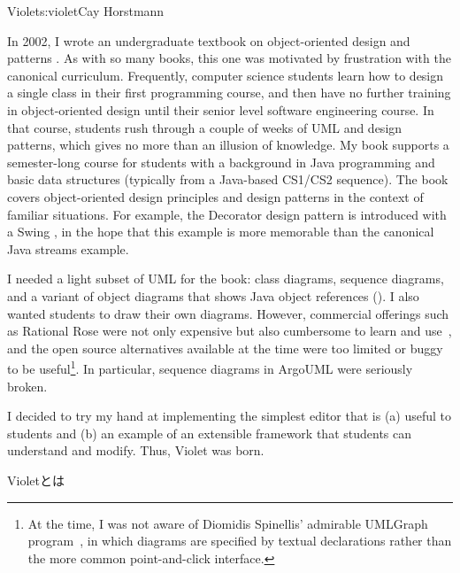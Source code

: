 \begin{aosachapter}{Violet}{s:violet}{Cay Horstmann}

In 2002, I wrote an undergraduate textbook on object-oriented design
and patterns \cite{bib:horstmann:oodp}.  As with so many books, this one
was motivated by frustration with the canonical curriculum.
Frequently, computer science students learn how to design a single
class in their first programming course, and then have no further
training in object-oriented design until their senior level software
engineering course. In that course, students rush through a couple of
weeks of UML and design patterns, which gives no more than an illusion
of knowledge. My book supports a semester-long course for students
with a background in Java programming and basic data structures
(typically from a Java-based CS1/CS2 sequence). The book covers object-oriented
design principles and design patterns in the context of familiar
situations. For example, the Decorator design pattern is introduced
with a Swing , in the hope that this example is more
memorable than the canonical Java streams example.


I needed a light subset of UML for the book: class diagrams, sequence
diagrams, and a variant of object diagrams that shows Java object
references ().  I also wanted students to
draw their own diagrams. However, commercial offerings such as
Rational Rose were not only expensive but also cumbersome to learn and
use~\cite{bib:shumba:ratrose}, and the open source alternatives
available at the time were too limited or buggy to be
useful\footnote{At the time, I was not aware of Diomidis Spinellis'
admirable UMLGraph program~\cite{bib:spinellis:umlgraph}, in which
diagrams are specified by textual declarations rather than the more
common point-and-click interface.}.  In particular, sequence
diagrams in ArgoUML were seriously broken.

I decided to try my hand at implementing the simplest editor that is
(a) useful to students and (b) an example of an extensible framework
that students can understand and modify. Thus, Violet was born.

\begin{aosasect1}{Violetとは}


\end{aosasect1}
\end{aosachapter}
